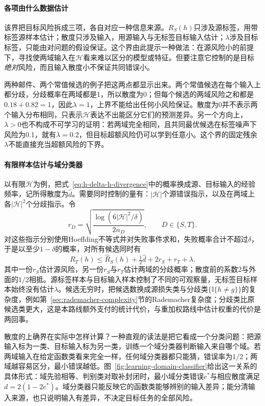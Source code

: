 \paragraph{各项由什么数据估计}
该界把目标风险拆成三项，各自对应一种信息来源。$R_S(h)$只涉及源标签，用带标签源样本估计；散度只涉及输入，用源输入与无标签目标输入估计；$\lambda$涉及目标标签，只能由对问题的假设保证。这个界由此提示一种做法：在源风险小的前提下，寻找使两域输入在$\mathcal H$看来难以区分的模型或特征。但要注意它控制的是目标\emph{绝对}风险，而且输入散度小不保证共同错误小。

两种邮件、两个常值候选的例子把这两点都显示出来。两个常值候选在每个输入上都分歧，分歧概率在两域都是1，所以散度为0；但每个候选的两域风险之和都是$0.18+0.82=1$，因此$\lambda=1$，上界不能给出任何小风险保证。散度为0并不表示两个输入分布相同，只表示$\mathcal H$表达不出能区分它们的预测差异。另一个方向上，$\lambda>0$也不构成不可学习的证明：若两域完全相同，且共同最优候选在标签噪声下风险为0.1，就有$\lambda=0.2$，但目标超额风险仍可以学到任意小。这个界的固定残余$\lambda$不能直接充当超额风险的下界。

\paragraph{有限样本估计与域分类器}
以有限$\mathcal H$为例，把式~\eqref{eq:h-delta-h-divergence}中的概率换成源、目标输入的经验频率，记所得散度为$\widehat d$。需要同时控制的量有：$|\mathcal H|$个源错误指示，以及在两域上各$|\mathcal H|^2$个分歧指示。令
\[
 r_D=\sqrt{\frac{\log(6|\mathcal H|^2/\delta)}{2n_D}},\qquad D\in\{S,T\}.
\]
对这些指示分别使用Hoeffding不等式并对失败事件求和，失败概率合计不超过$\delta$，于是以至少$1-\delta$的概率，对所有候选同时有
\[
 R_T(h)\leq\widehat R_S(h)+\tfrac12\widehat d+2r_S+r_T+\lambda .
\]
其中一份$r_S$估计源风险，另一份$r_S$与$r_T$估计两域的分歧概率；散度前的系数2与外面的$1/2$相抵。源标签样本与目标输入样本控制了不同的可观察量，无标签目标样本始终没有估计$\lambda$。候选无穷时，把候选数换成源损失类与分歧类$\{\mathbb I\{h\neq g\}\}$的复杂度，例如第~\ref{sec:rademacher-complexity}节的Rademacher复杂度；分歧类比原候选类更大，这是本路线额外支付的统计代价，与重加权路线中估计权重的代价是两回事。

散度的上确界在实际中怎样计算？一种直观的读法是把它看成一个分类问题：把源输入标为一类、目标输入标为另一类，训练一个域分类器判断输入来自哪个域。若两域输入在给定函数类看来完全一样，任何域分类器都只能猜，错误率为$1/2$；两域越容易区分，最小错误越低。图~\ref{fig:learning-domain-classifier}给出这一关系的具体形式：域先验相等、判别类对取补封闭时，最小域分类错误$e^*$与相应散度满足$d=2(1-2e^*)$。域分类器只能反映它的函数类能够辨别的输入差异；能分清输入来源，也只说明输入有差异，不决定目标任务的全部风险。

